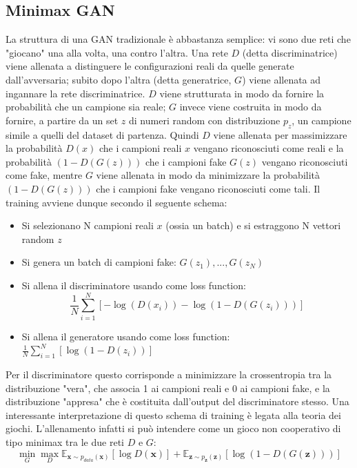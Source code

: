 \documentclass[a4paper]{article}
\begin{document}
\subsection{Minimax GAN}
La struttura di una GAN tradizionale è abbastanza semplice: vi sono due reti che "giocano" una alla volta, una contro l'altra. Una rete $D$ (detta discriminatrice) viene allenata a distinguere le configurazioni reali da quelle generate dall'avversaria; subito dopo l'altra (detta generatrice, $G$) viene allenata ad ingannare la rete discriminatrice. $D$ viene strutturata in modo da fornire la probabilità che un campione sia reale; $G$ invece viene costruita in modo da fornire, a partire da un set $z$ di numeri random con distribuzione $p_z$, un campione simile a quelli del dataset di partenza. Quindi $D$ viene allenata per massimizzare la probabilità $D(x)$ che i campioni reali $x$ vengano riconosciuti come reali e la probabilità $(1-D(G(z)))$ che i campioni fake $G(z)$ vengano riconosciuti come fake, mentre $G$ viene allenata in modo da minimizzare la probabilità $(1-D(G(z)))$ che i campioni fake vengano riconosciuti come tali.
Il training avviene dunque secondo il seguente schema:
\begin{itemize}
\item Si selezionano N campioni reali $x$ (ossia un batch) e si estraggono N vettori random $z$
\item Si genera un batch di campioni fake: $G(z_1), ..., G(z_N)$
\item Si allena il discriminatore usando come loss function: 
\begin{equation}
\frac{1}{N}\sum_{i=1}^{N} [-\log(D(x_i)) - \log(1-D(G(z_i)))]
\end{equation}
\item Si allena il generatore usando come loss function: $\frac{1}{N}\sum_{i=1}^{N} [\log(1-D(z_i))]$
\end{itemize}
Per il discriminatore questo corrisponde a minimizzare la crossentropia tra la distribuzione "vera", che associa 1 ai campioni reali e 0 ai campioni fake, e la distribuzione "appresa" che è costituita dall'output del discriminatore stesso. Una interessante interpretazione di questo schema di training è legata alla teoria dei giochi. L'allenamento infatti si può intendere come un gioco non cooperativo di tipo minimax tra le due reti $D$ e $G$:
\begin{equation}
\min _{G}\max _{D}\mathbb {E} _{{\boldsymbol {x}}\sim p_{data}({\boldsymbol {x}})}[\log D({\boldsymbol {x}})]+\mathbb {E} _{{\boldsymbol {z}}\sim p_{\boldsymbol {z}}({\boldsymbol {z}})}[\log(1-D(G({\boldsymbol {z}})))]
\end{equation}
\end{document}
